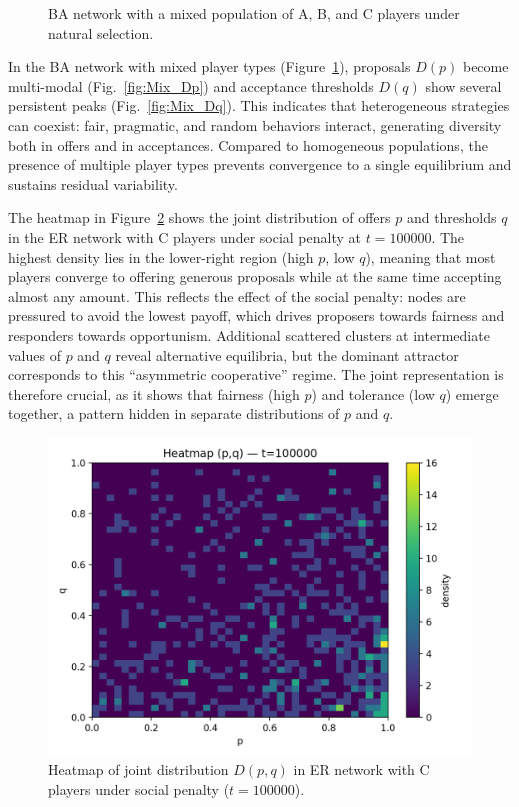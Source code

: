 \begin{figure}[h!]
\begin{minipage}[t]{0.48\textwidth}
        \label{fig:Mix_Dq}
    \end{minipage}
    \caption{BA network with a mixed population of A, B, and C players under natural selection.}
    \label{fig:BA_Mix}
\end{figure}

In the BA network with mixed player types (Figure~\ref{fig:BA_Mix}), proposals
$D(p)$ become multi-modal (Fig.~\ref{fig:Mix_Dp}) and acceptance thresholds
$D(q)$ show several persistent peaks (Fig.~\ref{fig:Mix_Dq}).  
This indicates that heterogeneous strategies can coexist: fair, pragmatic, and
random behaviors interact, generating diversity both in offers and in
acceptances.  
Compared to homogeneous populations, the presence of multiple player types
prevents convergence to a single equilibrium and sustains residual variability.



The heatmap in Figure~\ref{fig:ER_heatmap_pq} shows the joint distribution of
offers $p$ and thresholds $q$ in the ER network with C players under social
penalty at $t=100000$.  
The highest density lies in the lower-right region (high $p$, low $q$), meaning
that most players converge to offering generous proposals while at the same time
accepting almost any amount.  
This reflects the effect of the social penalty: nodes are pressured to avoid the
lowest payoff, which drives proposers towards fairness and responders towards
opportunism.  
Additional scattered clusters at intermediate values of $p$ and $q$ reveal
alternative equilibria, but the dominant attractor corresponds to this
“asymmetric cooperative” regime.  
The joint representation is therefore crucial, as it shows that fairness (high
$p$) and tolerance (low $q$) emerge together, a pattern hidden in separate
distributions of $p$ and $q$.

\begin{figure}[H]
    \centering
    \includegraphics[width=0.75\linewidth]{images/TASK1/heatmap_pq_t100000_ER_C_social_penalty.png}
    \caption{Heatmap of joint distribution $D(p,q)$ in ER network with C players under social penalty ($t=100000$).}
    \label{fig:ER_heatmap_pq}
\end{figure}


